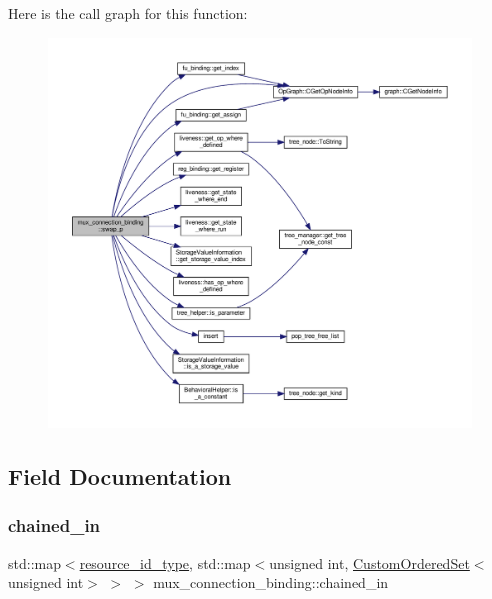Here is the call graph for this function\+:
\nopagebreak
\begin{figure}[H]
\begin{center}
\leavevmode
\includegraphics[width=350pt]{d7/d1e/classmux__connection__binding_a2eccd06bada7e07af12b2e14918dbbfa_cgraph}
\end{center}
\end{figure}


\subsection{Field Documentation}
\mbox{\label{classmux__connection__binding_a6a7f00a750edd58786915ba407f4fc0c}} 
\subsubsection{\texorpdfstring{chained\+\_\+in}{chained\_in}}
{\footnotesize\ttfamily std\+::map$<$\hyperlink{classmux__connection__binding_aa43c7eaf66a55ac97a5a7f57f6149025}{resource\+\_\+id\+\_\+type}, std\+::map$<$unsigned int, \hyperlink{classCustomOrderedSet}{Custom\+Ordered\+Set}$<$unsigned int$>$ $>$ $>$ mux\+\_\+connection\+\_\+binding\+::chained\+\_\+in\hspace{0.3cm}{\ttfamily [private]}}



